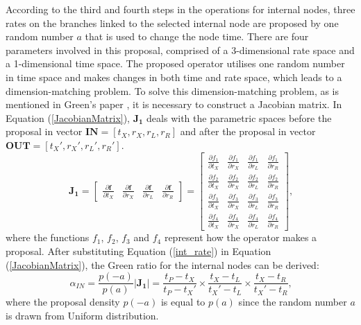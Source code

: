 \documentclass{bmcart}
\begin{document}
According to the third and fourth steps in the operations for internal nodes, three rates on the branches linked to the selected internal node are proposed by one random number $a$ that is used to change the node time. There are four parameters involved in this proposal, comprised of a 3-dimensional rate space and a 1-dimensional time space. The proposed operator utilises one random number in time space and makes changes in both time and rate space, which leads to a dimension-matching problem. To solve this dimension-matching problem, as is mentioned in Green's paper \cite{green1995reversible}, it is necessary to construct a Jacobian matrix.  In Equation (\ref{JacobianMatrix}), ${\mathbf{J_1}}$ deals with the parametric spaces before the proposal in vector ${\mathbf{IN}} = [{t_X},{r_X},{r_L},{r_R}]$ and after the proposal in vector ${\mathbf{OUT}} = [{t_X}',{r_X}',{r_L}',{r_R}']$.
\begin{equation}\label{JacobianMatrix}
{\mathbf{J_1}} = \left[ {\begin{array}{*{20}{c}}
  {\frac{{\partial {\mathbf{f}}}}{{\partial {t_X}}}}&{\frac{{\partial {\mathbf{f}}}}{{\partial {r_X}}}}&{\frac{{\partial {\mathbf{f}}}}{{\partial {r_L}}}}&{\frac{{\partial {\mathbf{f}}}}{{\partial {r_R}}}}
\end{array}} \right] = \left[ {\begin{array}{*{20}{c}}
  {\frac{{\partial {f_1}}}{{\partial {t_X}}}}&{\frac{{\partial {f_1}}}{{\partial {r_X}}}}&{\frac{{\partial {f_1}}}{{\partial {r_L}}}}&{\frac{{\partial {f_1}}}{{\partial {r_R}}}} \\
  {\frac{{\partial {f_2}}}{{\partial {t_X}}}}&{\frac{{\partial {f_2}}}{{\partial {r_X}}}}&{\frac{{\partial {f_2}}}{{\partial {r_L}}}}&{\frac{{\partial {f_2}}}{{\partial {r_R}}}} \\
  {\frac{{\partial {f_3}}}{{\partial {t_X}}}}&{\frac{{\partial {f_3}}}{{\partial {r_X}}}}&{\frac{{\partial {f_3}}}{{\partial {r_L}}}}&{\frac{{\partial {f_3}}}{{\partial {r_R}}}} \\
  {\frac{{\partial {f_4}}}{{\partial {t_X}}}}&{\frac{{\partial {f_4}}}{{\partial {r_X}}}}&{\frac{{\partial {f_4}}}{{\partial {r_L}}}}&{\frac{{\partial {f_4}}}{{\partial {r_R}}}}
\end{array}} \right]\text{,}
\end{equation}
where the functions ${f_1}$, ${f_2}$, ${f_3}$ and ${f_4}$ represent how the operator makes a proposal. After substituting Equation (\ref{int_rate}) in Equation (\ref{JacobianMatrix}), the Green ratio for the internal nodes can be derived:
\begin{equation}\label{HR1}
{\alpha_{IN}} = \frac{{p ( - a)}}{{p (a)}}\left| {\mathbf{J_1}} \right| = \frac{{{t_P} - {t_X}}}{{{t_P} - {t_X}'}} \times \frac{{{t_X} - {t_L}}}{{{t_X}' - {t_L}}} \times \frac{{{t_X} - {t_R}}}{{{t_X}' - {t_R}}}\text{,}
\end{equation}
where the proposal density ${p ( - a)}$ is equal to ${p ( a )}$ since the random number $a$ is drawn from Uniform distribution.
\end{document}
